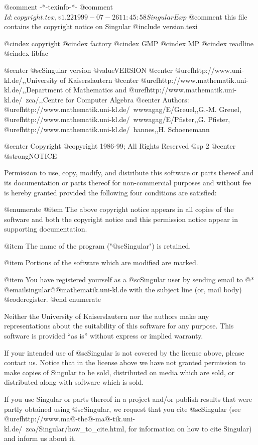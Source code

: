 @comment -*-texinfo-*-
@comment $Id: copyright.tex,v 1.22 1999-07-26 11:45:58 Singular Exp $
@comment this file contains the copyright notice on Singular
@include version.texi

@cindex copyright
@cindex factory
@cindex GMP
@cindex MP
@cindex readline
@cindex libfac

@center @sc{Singular} version @value{VERSION}
@center @uref{http://www.uni-kl.de/,,University of Kaiserslautern}
@center @uref{http://www.mathematik.uni-kl.de/,,Department of Mathematics} and  @uref{http://www.mathematik.uni-kl.de/~zca/,,Centre for Computer Algebra}
@center Authors: @uref{http://www.mathematik.uni-kl.de/~wwwagag/E/Greuel,,G.-M. Greuel}, @uref{http://www.mathematik.uni-kl.de/~wwwagag/E/Pfister,,G. Pfister}, @uref{http://www.mathematik.uni-kl.de/~hannes,,H. Schoenemann}

@center Copyright @copyright{} 1986-99; All Rights Reserved
@sp 2
@center @strong{NOTICE}

Permission to use, copy, modify, and distribute this software or parts
thereof and its documentation or parts thereof for non-commercial
purposes and without fee is hereby granted provided the following four
conditions are satisfied:

@enumerate
@item
The above copyright notice appears in all copies of the software
and both the copyright notice and this permission notice
appear in supporting documentation.

@item
The name of the program ("@sc{Singular}") is retained.

@item
Portions of the software which are modified are marked.

@item
You have registered yourself as a @sc{Singular} user by sending email to @*
@email{singular@@mathematik.uni-kl.de}
with the subject line (or, mail body)
@code{register}.
@end enumerate

Neither the University of Kaiserslautern nor the authors make any
representations about the suitability of this software for any
purpose.  This software is provided ``as is'' without express or
implied warranty.

If your intended use of @sc{Singular} is not covered by the license above,
please contact us.  Notice that in the license above we have not
granted permission to make copies of Singular to be sold, distributed
on media which are sold, or distributed along with software which is
sold.

If you use Singular or parts thereof in a project and/or publish
results that were partly obtained using @sc{Singular}, we request that you
cite @sc{Singular} (see
@uref{http://www.ma@-the@-ma@-tik.uni-kl.de/~zca/Singular/how_to_cite.html, for information}
 on how to cite Singular) and inform us about it.

